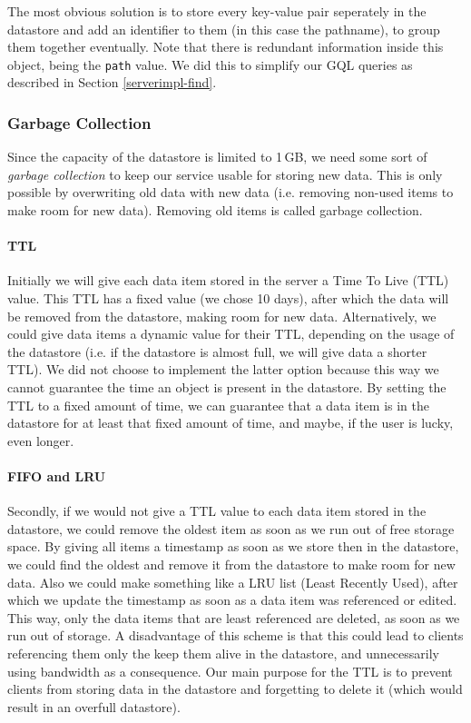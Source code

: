 The most obvious solution is to store every key-value pair seperately in the
datastore and add an identifier to them (in this case the pathname), to group
them together eventually. Note that there is redundant information inside this
object, being the \texttt{path} value. We did this to simplify our GQL queries as
described in Section \ref{serverimpl-find}.
 
\subsubsection{Garbage Collection}
Since the capacity of the datastore is limited to 1\,GB, we need some sort of
\emph{garbage collection} to keep our service usable for storing new data. This
is only possible by overwriting old data with new data (i.e. removing non-used
items to make room for new data). Removing old items is called garbage
collection.

\paragraph{TTL}
\label{serverdesign-ttl}
Initially we will give each data item stored in the server a Time To Live (TTL)
value. This TTL has a fixed value (we chose 10 days), after which the data will
be removed from the datastore, making room for new data. Alternatively, we could
give data items a dynamic value for their TTL, depending on the usage of the
datastore (i.e. if the datastore is almost full, we will give data a shorter
TTL). We did not choose to implement the latter option because this way we
cannot guarantee the time an object is present in the datastore. By setting the
TTL to a fixed amount of time, we can guarantee that a data item is in the
datastore for at least that fixed amount of time, and maybe, if the user is
lucky, even longer.

\paragraph{FIFO and LRU}
Secondly, if we would not give a TTL value to each data item stored in the
datastore, we could remove the oldest item as soon as we run out of free storage
space. By giving all items a timestamp as soon as we store then in the datastore,
we could find the oldest and remove it from the datastore to make room for new
data. Also we could make something like a LRU list (Least Recently Used), after
which we update the timestamp as soon as a data item was referenced or edited.
This way, only the data items that are least referenced are deleted, as soon as
we run out of storage. A disadvantage of this scheme is that this could lead to
clients referencing them only the keep them alive in the datastore, and
unnecessarily using bandwidth as a consequence. Our main purpose for the TTL is
to prevent clients from storing data in the datastore and forgetting to delete it
(which would result in an overfull datastore).

